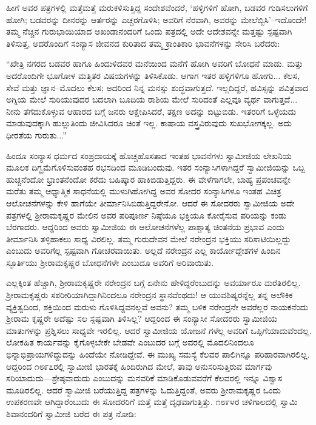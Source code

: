 ಹೀಗೆ ಅವರ ಪತ್ರಗಳಲ್ಲಿ ಮತ್ತೆಮತ್ತೆ ಮರುಕಳಿಸುತ್ತಿದ್ದ ಸಂದೇಶವೆಂದರೆ, ‘ಹಳ್ಳಿಗಳಿಗೆ ಹೋಗಿ, ಬಡವರ ಗುಡಿಸಲುಗಳಿಗೆ ಹೋಗಿ; ಬಡವರನ್ನು ದೀನರನ್ನು ಆರ್ತರನ್ನು ಎಚ್ಚರಗೊಳಿಸಿ; ಅವರಿಗೆ ನೆರವಾಗಿ, ಅವರನ್ನು ಮೇಲೆಬ್ಬಿಸಿ’–ಇದೊಂದೇ! ತಮ್ಮ ನೆಚ್ಚಿನ ಗುರುಭಾಯಿಯಾದ ಅಖಂಡಾನಂದರಿಗೆ ಒಂದು ಪತ್ರದಲ್ಲಿ ಅದೇ ಆದೇಶವನ್ನೇ ಮತ್ತಷ್ಟು ಸ್ಪಷ್ಟವಾಗಿ ತಿಳಿಸುತ್ತ, ಅದರೊಂದಿಗೆ ಸಂನ್ಯಾಸ ಜೀವನದ ಕುರಿತಾದ ತಮ್ಮ ಕ್ರಾಂತಿಕಾರಿ ಭಾವನೆಗಳನ್ನು ಸೇರಿಸಿ ಬರೆದರು:

“ಖೇತ್ರಿ ನಗರದ ಬಡವರ ಹಾಗೂ ಹಿಂದುಳಿದವರ ಮನೆಯಿಂದ ಮನೆಗೆ ಹೋಗಿ ಅವರಿಗೆ ಬೋಧನೆ ಮಾಡು. ಮತ್ತು ಅದರೊಂದಿಗೇ ಭೂಗೋಳ ಮತ್ತಿತರ ವಿಷಯಗಳನ್ನು ತಿಳಿಸಿಕೊಡು. ಆಗಾಗ ಇತರ ಹಳ್ಳಿಗಳಿಗೂ ಹೋಗು... ಕೆಲಸ, ಸೇವೆ ಮತ್ತು ಜ್ಞಾನ–ಮೊದಲು ಕೆಲಸ; ಅದರಿಂದ ನಿನ್ನ ಮನಸ್ಸು ಶುದ್ಧವಾಗುತ್ತದೆ. ಇಲ್ಲದಿದ್ದರೆ, ಹವಿಸ್ಸನ್ನು ಪವಿತ್ರವಾದ ಅಗ್ನಿಯ ಮೇಲೆ ಸುರಿಯುವುದರ ಬದಲಾಗಿ ಬೂದಿಯ ರಾಶಿಯ ಮೇಲೆ ಸುರಿದಂತೆ ಎಲ್ಲವೂ ವ್ಯರ್ಥ ವಾಗುತ್ತದೆ... ನೀನು ತೆಗೆದುಕೊಳ್ಳುವ ಆಹಾರದ ಬಗ್ಗೆ ಜನರು ಆಕ್ಷೇಪಿಸಿದರೆ, ತಕ್ಷಣ ಅದನ್ನು ಬಿಟ್ಟುಬಿಡು. ಇತರರಿಗೆ ಒಳ್ಳೆಯದು ಮಾಡುವುದಕ್ಕಾಗಿ ಹುಲ್ಲುತಿಂದು ಜೀವಿಸಿದರೂ ಚಿಂತೆ ಇಲ್ಲ. ಕಾಷಾಯ ವಸ್ತ್ರವಿರುವುದು ಸುಖಭೋಗಕ್ಕಲ್ಲ. ಅದು ಧೀರತೆಯ ಗುರುತು...”

ಹಿಂದೂ ಸಂನ್ಯಾಸ ಧರ್ಮದ ಸಂಪ್ರದಾಯಕ್ಕೆ ಹೊಚ್ಚಹೊಸತಾದ ಇಂತಹ ಭಾವನೆಗಳು ಸ್ವಾಮೀಜಿಯ ಲೇಖನಿಯ ಮೂಲಕ ದಿಗ್ಭ್ರಮೆಗೊಳಿಸುವಂತಹ ರಭಸದಿಂದ ಮೂಡಿಬಂದುವು. ಇತರ ಸಂನ್ಯಾಸಿಗಳಾಗಿದ್ದರೆ ಸ್ವಾಮೀಜಿಯನ್ನು ಒಬ್ಬ ಹುಚ್ಚನೆಂದೋ ಭ್ರಾಂತನೆಂದೋ ಕರೆದು ಬಹಿಷ್ಕಾರ ಹಾಕಿಬಿಡುತ್ತಿದ್ದರು. ಈ ವೇಳೆಗಾಗಲೇ, ಬಾಹ್ಯ ಪ್ರಪಂಚವನ್ನೇ ಮರೆತು ತಮ್ಮ ಆಧ್ಯಾತ್ಮಿಕ ಸಾಧನೆಯಲ್ಲಿ ಮುಳುಗಿಹೋಗಿದ್ದ ಅವರ ಸೋದರ ಸಂನ್ಯಾಸಿಗಳೂ ಇಂತಹ ವಿಚಿತ್ರ ಆಲೋಚನೆಗಳನ್ನು ಕೇಳಿ ಹಾಗೆಯೇ ತೀರ್ಮಾನಿಸಿಬಿಡುತ್ತಿದ್ದರೇನೋ. ಆದರೆ ಈ ಸೋದರರು ಸ್ವಾಮೀಜಿಯ ಅದೇ ಪತ್ರಗಳಲ್ಲಿ ಶ್ರೀರಾಮಕೃಷ್ಣರ ಮೇಲಿನ ಅವರ ಪರಿಪೂರ್ಣ ನಿಷ್ಠೆಯೂ ಭಕ್ತಿಯೂ ಕೋರೈಸುವ ಪರಿಯನ್ನು ಕಂಡು ಬೆರಗಾದರು. ಆದ್ದರಿಂದ ಅವರು ಸ್ವಾಮೀಜಿಯ ಈ ಆಲೋಚನೆಗಳೆಲ್ಲ ಪಾಶ್ಚಾತ್ಯ ಚಿಂತನೆಯ ಪ್ರಭಾವ ಎಂದು ತೀರ್ಮಾನಿಸಿ ತಳ್ಳಿಹಾಕಲು ಸಾಧ್ಯ ವಿರಲಿಲ್ಲ. ತಮ್ಮ ಗುರುದೇವನ ಮೇಲೆ ನರೇಂದ್ರನ ಭಕ್ತಿಯು ಸರಿಸಾಟಿಯಿಲ್ಲದ್ದು ಎಂಬುದು ಅವರಿಗೆಲ್ಲ ಸ್ಪಷ್ಟವಾಗಿ ಗೋಚರವಾಯಿತು. ಅಲ್ಲದೆ ನರೇಂದ್ರನ ಎಲ್ಲ ಕಾರ್ಯೋದ್ದೇಶಗಳ ಹಿಂದಿನ ಸ್ಫೂರ್ತಿಯು ಶ್ರೀರಾಮಕೃಷ್ಣರ ಬೋಧನೆಗಳೇ ಎಂಬುದೂ ಅವರಿಗೆ ಅರಿವಾಯಿತು.

ಎಲ್ಲಕ್ಕಿಂತ ಹೆಚ್ಚಾಗಿ, ಶ್ರೀರಾಮಕೃಷ್ಣರೇ ನರೇಂದ್ರನ ಬಗ್ಗೆ ಏನೇನು ಹೇಳಿದ್ದರೆಂಬುದನ್ನು ಅವರ್ಯಾರೂ ಮರೆತಿರಲಿಲ್ಲ. ಶ್ರೀರಾಮಕೃಷ್ಣರು ಸಶರೀರಿಯಾಗಿದ್ದಾಗಿನಿಂದಲೂ ನರೇಂದ್ರನ ಸ್ಥಾನವೆಂಥದು! ಆ ಯುವಶಿಷ್ಯರನ್ನೆಲ್ಲ ತನ್ನ ಅಲೌಕಿಕ ವ್ಯಕ್ತಿತ್ವದಿಂದ, ಶಕ್ತಿಯಿಂದ ಮರುಳು ಗೊಳಿಸಿದ್ದವನಲ್ಲವೆ ಅವನು? ತಮ್ಮ ಬಳಿಕ ನರೇಂದ್ರನೇ ಅವರೆಲ್ಲರ ನಾಯಕನೆಂದು ಶ್ರೀರಾಮ ಕೃಷ್ಣರೇ ಅದೆಷ್ಟು ಸಲ ಸ್ಪಷ್ಟವಾಗಿ ತಿಳಿಸಿಲ್ಲ? ಆದ್ದರಿಂದ ಈ ಸಂನ್ಯಾಸೀ ಸೋದರರು ಸ್ವಾಮೀಜಿಯ ಮಾತುಗಳನ್ನು ಪ್ರಶ್ನಿಸಲು ಸಾಧ್ಯವೇ ಇರಲಿಲ್ಲ. ಆದರೆ ಸ್ವಾಮೀಜಿಯ ಯೋಜನೆ ಗಳೆಲ್ಲ ಅವರಿಗೆ ಒಪ್ಪಿಗೆಯಾದುವೆಂದಲ್ಲ. ಲೋಕಹಿತ ಕಾರ್ಯವನ್ನು ಕೈಗೊಳ್ಳಬೇಕೇ ಬೇಡವೇ ಎಂಬುದರ ಬಗ್ಗೆ ಅವರಲ್ಲಿ ಮೊದಲಿನಿಂದಲೂ ಭಿನ್ನಾಭಿಪ್ರಾಯಗಳಿದ್ದುದನ್ನು ಹಿಂದೆಯೇ ನೋಡಿದ್ದೇವೆ. ಈ ಮುಖ್ಯ ಸಮಸ್ಯೆ ಕೆಲವರ ಪಾಲಿಗಿನ್ನೂ ಪರಿಹಾರವಾಗಿರಲಿಲ್ಲ. ಆದ್ದರಿಂದ ೧೮೯೭ರಲ್ಲಿ ಸ್ವಾಮೀಜಿ ಭಾರತಕ್ಕೆ ಹಿಂದಿರುಗಿದ ಮೇಲೆ, ತಾವು ಅನುಸರಿಸುತ್ತಿರುವ ಮಾರ್ಗವು ಸರಿಯಾದುದು—ಶ್ರೇಷ್ಠವಾದುದು ಎಂಬುದನ್ನು ಮನವರಿಕೆ ಮಾಡಿಕೊಡುವವರೆಗೆ ಕೆಲವರಲ್ಲಿ ಇನ್ನೂ ವಿಶ್ವಾಸ ಮೂಡಿರಲಿಲ್ಲ. ಆದರೆ ಸ್ವಾಮೀಜಿ ಬರೆಯುತ್ತಿದ್ದ ಪತ್ರಗಳನ್ನು ಓದುತ್ತಿದ್ದಂತೆ, ಅವರು ಶ್ರೀರಾಮಕೃಷ್ಣರ ಒಂದು ಉಪಕರಣವೇ ಆಗಿದ್ದಾರೆಂಬುದು ಈ ಸೋದರರಿಗೆ ಮತ್ತೆ ಮತ್ತೆ ದೃಢವಾಗುತ್ತಿತ್ತು. ೧೮೯೪ರ ಚಳಿಗಾಲದಲ್ಲಿ ಸ್ವಾಮಿ ಶಿವಾನಂದರಿಗೆ ಸ್ವಾಮೀಜಿ ಬರೆದ ಈ ಪತ್ರ ನೋಡಿ:

